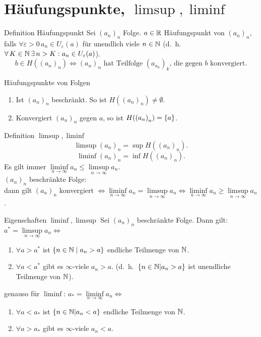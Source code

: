 \documentclass[main.tex]{subfiles}
\begin{document}
\section*{Häufungspunkte, \( \limsup, \liminf\)}

\begin{karte}{Definition Häufungspunkt}
    Sei \({(a_n)}_n\) Folge. \(a\in\mathbb{R} \) Häufungspunkt 
    von \({(a_n)}_n\), falls \(\forall\varepsilon>0\, 
    a_n\in U_\varepsilon(a) \) für unendlich viele 
    \(n\in\mathbb{N} \) (d.\ h.\  \( \forall K\in\N \,\exists 
    n>K:a_n \in U_\varepsilon (a) \)).
    \[ b\in H({(a_n)}_n) \Leftrightarrow 
    {(a_n)}_n \text{ hat Teilfolge } 
    {(a_{n_k})}_k \text{, die gegen } 
    b \text{ konvergiert}. \]
\end{karte}
\begin{karte}{Häufungspunkte von Folgen}
    \begin{enumerate}
        \item Ist \({(a_n)}_n\) beschränkt. 
        So ist \(H({(a_n)}_n) \neq \emptyset \).
        \item Konvergiert \({(a_n)}_n\) gegen 
        \(a\), so ist \( H({(a_n)}_n) = \{a\} \).
	\end{enumerate}
\end{karte}
\begin{karte}{Definition \( \limsup, \liminf \)}
    \[ \limsup {(a_n)}_n = \sup H({(a_n)}_n). \]
    \[ \liminf {(a_n)}_n = \inf H({(a_n)}_n). \]
    Es gilt immer \( \liminf\limits_{n\rightarrow\infty}
    a_n \leq \limsup\limits_{n\rightarrow\infty}a_n \). \\
    \({(a_n)}_n\) beschränkte Folge:\\
    dann gilt \({(a_n)}_n\) konvergiert \( \Leftrightarrow 
    \liminf\limits_{n\rightarrow\infty}
    a_n = \limsup\limits_{n\rightarrow\infty}a_n 
    \Leftrightarrow \liminf\limits_{n\rightarrow\infty}a_n 
    \geq \limsup\limits_{n\rightarrow\infty}a_n \).
\end{karte}
\begin{karte}{Eigenschaften \(\liminf, \limsup \)}
    Sei \({(a_n)}_n\) beschränkte Folge. Dann gilt:\\
	\(a^* = \limsup\limits_{n\rightarrow\infty}a_n \Leftrightarrow \)
	\begin{enumerate}
        \item \(\forall a> a^* \) ist \( \{n\in\mathbb{N} \;\vert \; a_n>a\} \) 
        endliche Teilmenge von \(\mathbb{N} \).
        \item \( \forall a<a^* \) gibt es \(\infty \)-viele \(a_n >a\). 
        (d.\ h.\  \( \{ n\in\mathbb{N}|a_n>a\} \) ist unendliche 
        Teilmenge von \(\mathbb{N} \)).
	\end{enumerate}
	genauso für \( \liminf \):
	\(a_* = \liminf\limits_{n\rightarrow\infty}a_n \Leftrightarrow \)
	\begin{enumerate}
        \item \(\forall a< a_* \) ist \( \{n\in\mathbb{N} |a_n<a\} \) 
        endliche Teilmenge von \(\mathbb{N} \).
		\item \( \forall a>a_* \) gibt es \(\infty \)-viele \(a_n<a\).
    \end{enumerate}
\end{karte}
\end{document}
